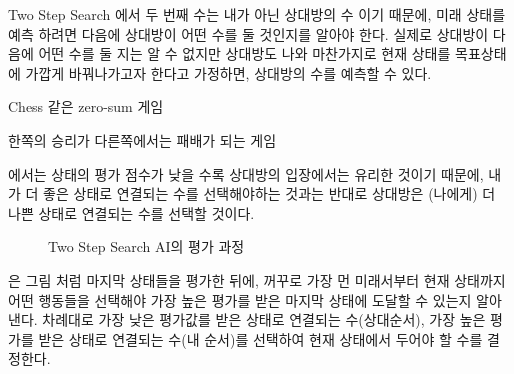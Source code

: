 \documentclass[letterpaper,10pt,english]{sphinxmanual}
\begin{document}
Two Step Search 에서 두 번째 수는 내가 아닌 상대방의 수 이기 때문에, 미래 상태를 예측 하려면
다음에 상대방이 어떤 수를 둘 것인지를 알아야 한다. 실제로 상대방이 다음에 어떤 수를 둘 지는 알 수 없지만
상대방도 나와 마찬가지로 현재 상태를 목표상태에 가깝게 바꿔나가고자 한다고 가정하면, 상대방의 수를 예측할 수 있다.

Chess 같은 zero-sum 게임 %
\begin{footnote}[1]\sphinxAtStartFootnote
한쪽의 승리가 다른쪽에서는 패배가 되는 게임
%
\end{footnote} 에서는 상태의 평가 점수가 낮을 수록 상대방의 입장에서는 유리한 것이기 때문에,
내가 더 좋은 상태로 연결되는 수를 선택해야하는 것과는 반대로 상대방은 (나에게) 더 나쁜 상태로 연결되는 수를 선택할 것이다.

\begin{figure}[htbp]
\centering
\capstart

\noindent{}
\caption{Two Step Search AI의 평가 과정}\label{\detokenize{03-basic_ai_examples:two-step-search-ai-eval}}\label{\detokenize{03-basic_ai_examples:id32}}\end{figure}

{\hyperref[\detokenize{03-basic_ai_examples:two-step-search-ai-eval}]{}} 은 그림 처럼 마지막 상태들을 평가한 뒤에, 꺼꾸로 가장 먼 미래서부터 현재 상태까지 어떤 행동들을 선택해야
가장 높은 평가를 받은 마지막 상태에 도달할 수 있는지 알아낸다. 차례대로  가장 낮은 평가값를 받은 상태로 연결되는 수(상대순서),
가장 높은 평가를 받은 상태로 연결되는 수(내 순서)를 선택하여 현재 상태에서 두어야 할 수를 결정한다.
\end{document}

